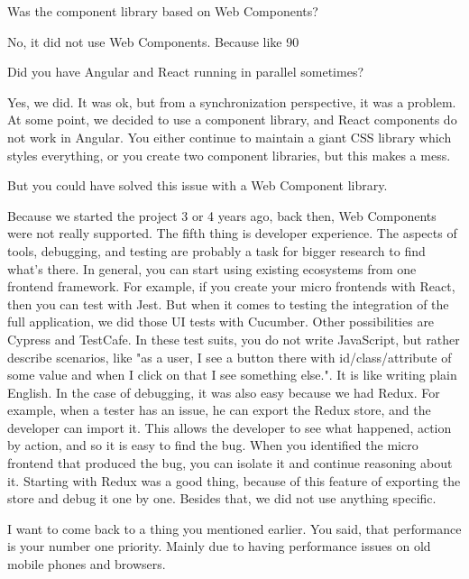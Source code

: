 \begin{description}
    \NicoVogel Was the component library based on Web Components?

    \IvanJovanovic No, it did not use Web Components. Because like 90%

    \NicoVogel Did you have Angular and React running in parallel sometimes?

    \IvanJovanovic Yes, we did. It was ok, but from a synchronization perspective, it was a problem. At some point, we decided to use a component library, and React components do not work in Angular. You either continue to maintain a giant CSS library which styles everything, or you create two component libraries, but this makes a mess.

    \NicoVogel But you could have solved this issue with a Web Component library.

    \IvanJovanovic Because we started the project 3 or 4 years ago, back then, Web Components were not really supported.
    The fifth thing is developer experience. The aspects of tools, debugging, and testing are probably a task for bigger research to find what's there. In general, you can start using existing ecosystems from one frontend framework. For example, if you create your micro frontends with React, then you can test with Jest. But when it comes to testing the integration of the full application, we did those UI tests with Cucumber. Other possibilities are Cypress and TestCafe. In these test suits, you do not write JavaScript, but rather describe scenarios, like "as a user, I see a button there with id/class/attribute of some value and when I click on that I see something else.". It is like writing plain English.
    In the case of debugging, it was also easy because we had Redux. For example, when a tester has an issue, he can export the Redux store, and the developer can import it. This allows the developer to see what happened, action by action, and so it is easy to find the bug. When you identified the micro frontend that produced the bug, you can isolate it and continue reasoning about it.
    Starting with Redux was a good thing, because of this feature of exporting the store and debug it one by one. Besides that, we did not use anything specific.

    \NicoVogel I want to come back to a thing you mentioned earlier. You said, that performance is your number one priority. Mainly due to having performance issues on old mobile phones and browsers.


\end{description}
